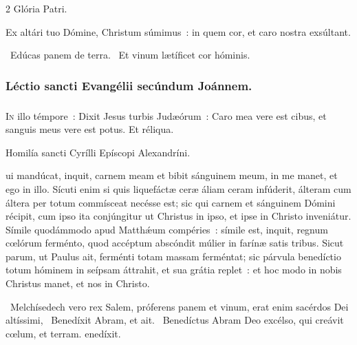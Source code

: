 \documentclass[9pt,twoside]{extarticle}
\begin{document}
\begin{multicols}{2}
Glória Patri.

\begin{tightlist}{}
\item {} Ex altári tuo Dómine, Christum súmimus~: in quem cor, et caro nostra exsúltant.
\item {}~Edúcas panem de terra. ~Et vinum lætíficet cor hóminis.
\end{tightlist}

\subsubsection*{\center Léctio sancti Evangélii secúndum Joánnem.}
\subsubsection*{\center {}}
\lettrine{I}n illo témpore~: Dixit Jesus turbis Judæórum~: Caro mea vere est cibus, et sanguis meus vere est potus. Et réliqua.

\begin{center}Homilía sancti Cyrílli Epíscopi Alexandríni.\\
 \end{center}
ui mandúcat, inquit, carnem meam et bibit sánguinem meum, in me manet, et ego in illo. Sícuti enim si quis liquefáctæ ceræ áliam ceram infúderit, álteram cum áltera per totum commísceat necésse est; sic qui carnem et sánguinem Dómini récipit, cum ipso ita conjúngitur ut Christus in ipso, et ipse in Christo inveniátur. Símile quodámmodo apud Matthǽum compéries~: símile est, inquit, regnum cœlórum ferménto, quod accéptum abscóndit múlier in farínæ satis tribus. Sicut parum, ut Paulus ait, ferménti totam massam ferméntat; sic párvula benedíctio totum hóminem in seípsam áttrahit, et sua grátia replet~: et hoc modo in nobis Christus manet, et nos in Christo.

\begin{tightlist}{}
\item {}~Melchísedech vero rex Salem, próferens panem et vinum, erat enim sacérdos Dei altíssimi, \textred{*}~Benedíxit Abram, et ait. ~Benedíctus Abram Deo excélso, qui creávit cœlum, et terram. enedíxit.
\end{tightlist}


\end{multicols}
\end{document}
